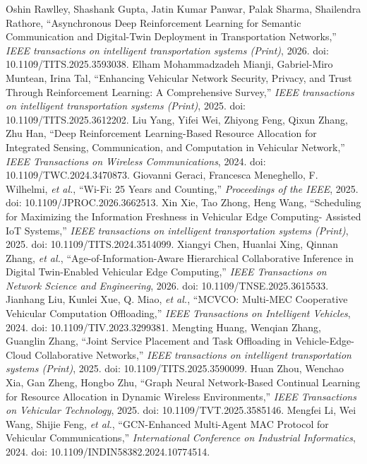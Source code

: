  Oshin Rawlley, Shashank Gupta, Jatin Kumar Panwar, Palak Sharma, Shailendra Rathore, ``Asynchronous Deep Reinforcement Learning for Semantic Communication and Digital-Twin Deployment in Transportation Networks,'' \emph{IEEE transactions on intelligent transportation systems (Print)}, 2026. doi: 10.1109/TITS.2025.3593038.
 Elham Mohammadzadeh Mianji, Gabriel-Miro Muntean, Irina Tal, ``Enhancing Vehicular Network Security, Privacy, and Trust Through Reinforcement Learning: A Comprehensive Survey,'' \emph{IEEE transactions on intelligent transportation systems (Print)}, 2025. doi: 10.1109/TITS.2025.3612202.
 Liu Yang, Yifei Wei, Zhiyong Feng, Qixun Zhang, Zhu Han, ``Deep Reinforcement Learning-Based Resource Allocation for Integrated Sensing, Communication, and Computation in Vehicular Network,'' \emph{IEEE Transactions on Wireless Communications}, 2024. doi: 10.1109/TWC.2024.3470873.
 Giovanni Geraci, Francesca Meneghello, F. Wilhelmi, \emph{et al.}, ``Wi-Fi: 25 Years and Counting,'' \emph{Proceedings of the IEEE}, 2025. doi: 10.1109/JPROC.2026.3662513.
 Xin Xie, Tao Zhong, Heng Wang, ``Scheduling for Maximizing the Information Freshness in Vehicular Edge Computing- Assisted IoT Systems,'' \emph{IEEE transactions on intelligent transportation systems (Print)}, 2025. doi: 10.1109/TITS.2024.3514099.
 Xiangyi Chen, Huanlai Xing, Qinnan Zhang, \emph{et al.}, ``Age-of-Information-Aware Hierarchical Collaborative Inference in Digital Twin-Enabled Vehicular Edge Computing,'' \emph{IEEE Transactions on Network Science and Engineering}, 2026. doi: 10.1109/TNSE.2025.3615533.
 Jianhang Liu, Kunlei Xue, Q. Miao, \emph{et al.}, ``MCVCO: Multi-MEC Cooperative Vehicular Computation Offloading,'' \emph{IEEE Transactions on Intelligent Vehicles}, 2024. doi: 10.1109/TIV.2023.3299381.
 Mengting Huang, Wenqian Zhang, Guanglin Zhang, ``Joint Service Placement and Task Offloading in Vehicle-Edge-Cloud Collaborative Networks,'' \emph{IEEE transactions on intelligent transportation systems (Print)}, 2025. doi: 10.1109/TITS.2025.3590099.
 Huan Zhou, Wenchao Xia, Gan Zheng, Hongbo Zhu, ``Graph Neural Network-Based Continual Learning for Resource Allocation in Dynamic Wireless Environments,'' \emph{IEEE Transactions on Vehicular Technology}, 2025. doi: 10.1109/TVT.2025.3585146.
 Mengfei Li, Wei Wang, Shijie Feng, \emph{et al.}, ``GCN-Enhanced Multi-Agent MAC Protocol for Vehicular Communications,'' \emph{International Conference on Industrial Informatics}, 2024. doi: 10.1109/INDIN58382.2024.10774514.
